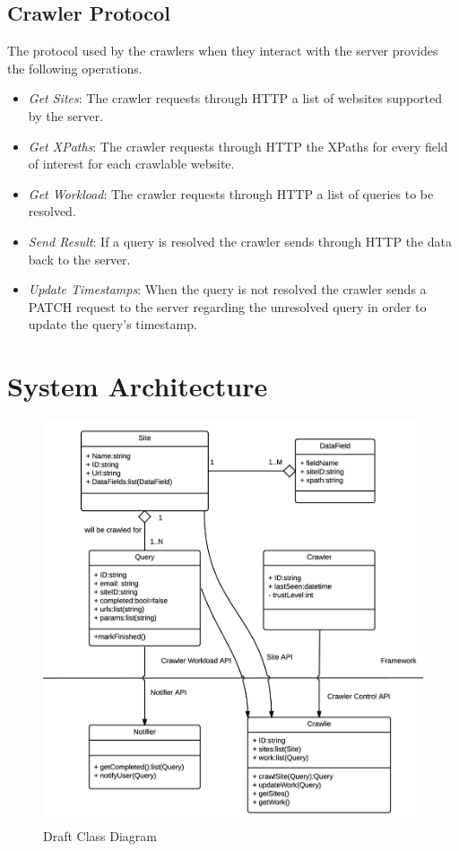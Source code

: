     \section{Crawler Protocol}
        The protocol used by the crawlers when they interact with the server
        provides the following operations. 
        \begin{itemize}
                \item \emph{Get Sites}: The crawler requests through HTTP a
                    list of websites supported by the server.
                \item \emph{Get XPaths}: The crawler requests through HTTP the
                    XPaths for every field of interest for each crawlable
                    website.
                \item \emph{Get Workload}: The crawler requests through HTTP a
                    list of queries to be resolved.
                \item \emph{Send Result}: If a query is resolved the crawler
                    sends through HTTP the data back to the server.
                \item \emph{Update Timestamps}: When the query is not resolved
                    the crawler sends a PATCH request to the server regarding
                    the unresolved query in order to update the query's
                    timestamp.
        \end{itemize}

\chapter{System Architecture}
    \begin{figure}[h]
        \includegraphics[width=\textwidth]{files/high_level_diagram.png}
        \caption{Draft Class Diagram}
        \label{fig:high_level_diagram}
    \end{figure}

